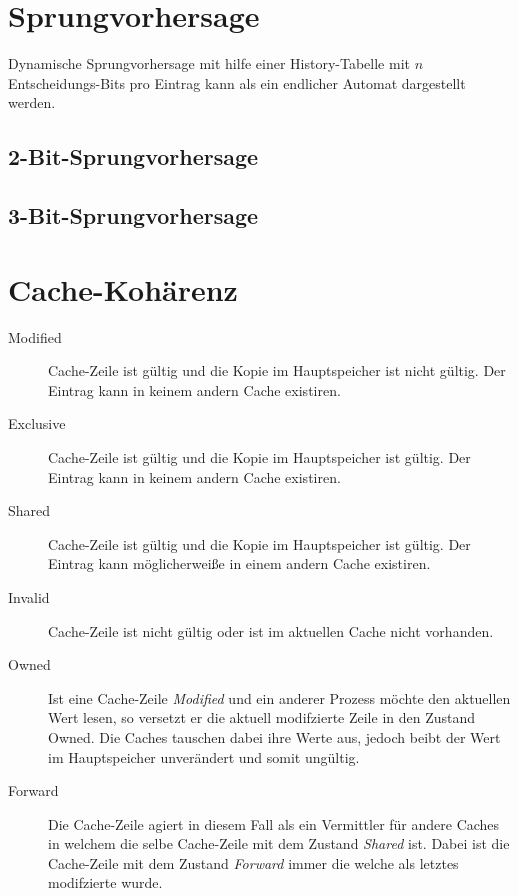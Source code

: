 \documentclass
[
	8pt,		%
	ngerman,	%
	a4paper,	%
	landscape,	%
	final		%
]{extarticle}
\begin{document}
\begin{multicols*}{4}
\section{Sprungvorhersage}
Dynamische Sprungvorhersage mit hilfe einer History-Tabelle mit \(n\)
Entscheidungs-Bits pro Eintrag kann als ein endlicher Automat dargestellt
werden.
\subsection{2-Bit-Sprungvorhersage}
\begin{center}
	
\end{center}
\subsection{3-Bit-Sprungvorhersage}
\begin{center}
	
\end{center}
\section{Cache-Kohärenz}
\begin{description}
	\item[Modified] Cache-Zeile ist gültig und die Kopie im Hauptspeicher
	      ist nicht gültig. Der Eintrag kann in keinem andern Cache
	      existiren.
	\item[Exclusive] Cache-Zeile ist gültig und die Kopie im Hauptspeicher
	      ist gültig. Der Eintrag kann in keinem andern Cache existiren.
	\item[Shared] Cache-Zeile ist gültig und die Kopie im Hauptspeicher
	      ist gültig. Der Eintrag kann möglicherweiße in einem andern Cache
	      existiren.
	\item[Invalid] Cache-Zeile ist nicht gültig oder ist im aktuellen Cache
	      nicht vorhanden.
	\item[Owned] Ist eine Cache-Zeile \textit{Modified} und ein anderer
	      Prozess möchte den aktuellen Wert lesen, so versetzt er die
	      aktuell modifzierte Zeile in den Zustand Owned. Die Caches
	      tauschen dabei ihre Werte aus, jedoch beibt der Wert im
	      Hauptspeicher unverändert und somit ungültig.
	\item[Forward] Die Cache-Zeile agiert in diesem Fall als ein Vermittler
	      für andere Caches in welchem die selbe Cache-Zeile mit dem Zustand
	      \textit{Shared} ist. Dabei ist die Cache-Zeile mit dem Zustand
	      \textit{Forward} immer die welche als letztes modifzierte wurde.
\end{description}

\end{multicols*}
\end{document}
